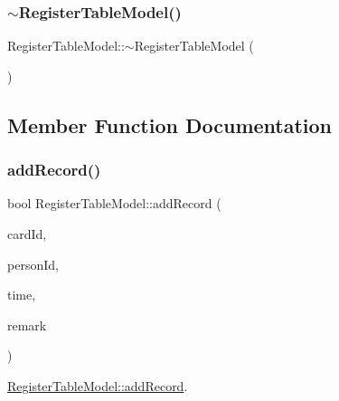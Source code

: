 \mbox{\label{class_register_table_model_acccc34c26bec67f8b09d677770081f29}} 
\subsubsection{\texorpdfstring{$\sim$RegisterTableModel()}{~RegisterTableModel()}}
{\footnotesize\ttfamily Register\+Table\+Model\+::$\sim$\+Register\+Table\+Model (\begin{DoxyParamCaption}{ }\end{DoxyParamCaption})}



\subsection{Member Function Documentation}
\mbox{\label{class_register_table_model_a00875a777cf37efa655d76c3437d11bf}} 
\subsubsection{\texorpdfstring{addRecord()}{addRecord()}}
{\footnotesize\ttfamily bool Register\+Table\+Model\+::add\+Record (\begin{DoxyParamCaption}\item[{Q\+String \&}]{card\+Id,  }\item[{Q\+String \&}]{person\+Id,  }\item[{Q\+String \&}]{time,  }\item[{Q\+String \&}]{remark }\end{DoxyParamCaption})}



\mbox{\hyperlink{class_register_table_model_a00875a777cf37efa655d76c3437d11bf}{Register\+Table\+Model\+::add\+Record}}. 


